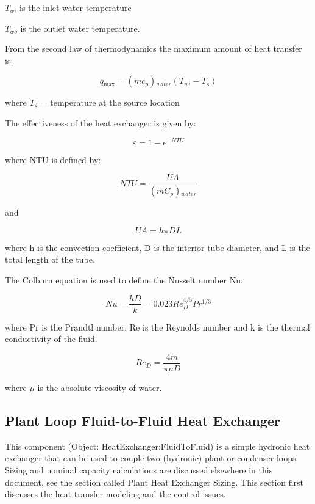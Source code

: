 \(T{}_{wi}\) is the inlet water temperature

\(T{}_{wo}\) is the outlet water temperature.

From the second law of thermodynamics the maximum amount of heat transfer is:

\begin{equation}
q{}_{\max } = (\dot mc{}_p){}_{water}(T{}_{wi} - T{}_s)
\end{equation}

where \(T_{s}\) = temperature at the source location

The effectiveness of the heat exchanger is given by:

\begin{equation}
\varepsilon  = 1 - {e^{ - NTU}}
\end{equation}

where NTU is defined by:

\begin{equation}
NTU = \frac{{UA}}{{(\dot mC{}_p){}_{water}}}
\end{equation}

and

\begin{equation}
UA = h\pi DL
\end{equation}

where h is the convection coefficient, D is the interior tube diameter, and L is the total length of the tube.

The Colburn equation is used to define the Nusselt number Nu:

\begin{equation}
Nu = \frac{{hD}}{k} = 0.023{{Re}_D^{4/5}}{Pr^{1/3}}
\end{equation}

where Pr is the Prandtl number, Re is the Reynolds number and k is the thermal conductivity of the fluid.

\begin{equation}
{Re}_D = \frac{{4\dot m}}{{\pi \mu D}}
\end{equation}

where \(\mu\) is the absolute viscosity of water.

\subsection{Plant Loop Fluid-to-Fluid Heat Exchanger}\label{plant-loop-fluid-to-fluid-heat-exchanger}

This component (Object: HeatExchanger:FluidToFluid) is a simple hydronic heat exchanger that can be used to couple two (hydronic) plant or condenser loops.~ Sizing and nominal capacity calculations are discussed elsewhere in this document, see the section called Plant Heat Exchanger Sizing. This section first discusses the heat transfer modeling and the control issues.

